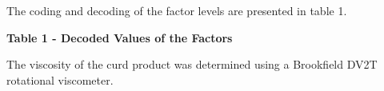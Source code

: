 The coding and decoding of the factor levels are presented in table 1.

{\bfseries Table 1 - Decoded Values of the Factors}


The viscosity of the curd product was determined using a Brookfield DV2T
rotational viscometer.

